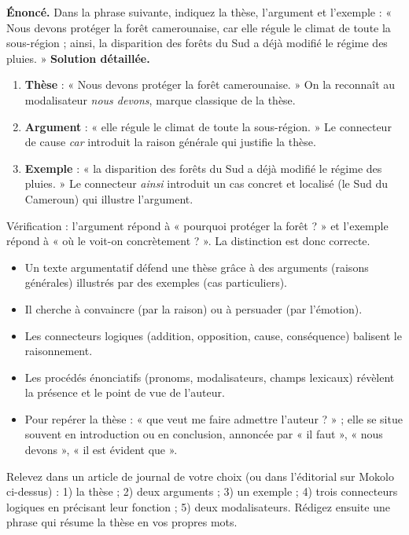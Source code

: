 \documentclass[11pt]{article}
\newcommand{\cle}[1]{{\popxbold\color{popdark}#1}}
\begin{document}
\begin{exoresolu}
\textbf{Énoncé.} Dans la phrase suivante, indiquez la thèse, l'argument et l'exemple : « Nous devons protéger la forêt camerounaise, car elle régule le climat de toute la sous-région ; ainsi, la disparition des forêts du Sud a déjà modifié le régime des pluies. »
\tcblower
\textbf{Solution détaillée.}
\begin{enumerate}
\item \textbf{Thèse} : « Nous devons protéger la forêt camerounaise. » On la reconnaît au modalisateur \emph{nous devons}, marque classique de la thèse.
\item \textbf{Argument} : « elle régule le climat de toute la sous-région. » Le connecteur de cause \emph{car} introduit la raison générale qui justifie la thèse.
\item \textbf{Exemple} : « la disparition des forêts du Sud a déjà modifié le régime des pluies. » Le connecteur \emph{ainsi} introduit un cas concret et localisé (le Sud du Cameroun) qui illustre l'argument.
\end{enumerate}
Vérification : l'argument répond à « pourquoi protéger la forêt ? » et l'exemple répond à « où le voit-on concrètement ? ». La distinction est donc correcte.
\end{exoresolu}

\begin{aretenir}
\begin{itemize}
\item Un texte argumentatif défend une \cle{thèse} grâce à des \cle{arguments} (raisons générales) illustrés par des \cle{exemples} (cas particuliers).
\item Il cherche à \cle{convaincre} (par la raison) ou à \cle{persuader} (par l'émotion).
\item Les \cle{connecteurs logiques} (addition, opposition, cause, conséquence) balisent le raisonnement.
\item Les \cle{procédés énonciatifs} (pronoms, modalisateurs, champs lexicaux) révèlent la présence et le point de vue de l'auteur.
\item Pour repérer la thèse : « que veut me faire admettre l'auteur ? » ; elle se situe souvent en introduction ou en conclusion, annoncée par « il faut », « nous devons », « il est évident que ».
\end{itemize}
\end{aretenir}

\begin{exercice}
Relevez dans un article de journal de votre choix (ou dans l'éditorial sur Mokolo ci-dessus) : 1) la thèse ; 2) deux arguments ; 3) un exemple ; 4) trois connecteurs logiques en précisant leur fonction ; 5) deux modalisateurs. Rédigez ensuite une phrase qui résume la thèse en vos propres mots.
\end{exercice}
\end{document}
